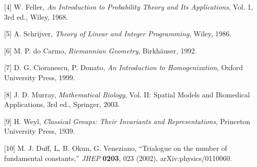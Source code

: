 \documentclass[
  11pt,
]{article}
\begin{document}
{[}4{]} W. Feller, \emph{An Introduction to Probability Theory and Its
Applications}, Vol. 1, 3rd ed., Wiley, 1968.

{[}5{]} A. Schrijver, \emph{Theory of Linear and Integer Programming},
Wiley, 1986.

{[}6{]} M. P. do Carmo, \emph{Riemannian Geometry}, Birkhäuser, 1992.

{[}7{]} D. G. Cioranescu, P. Donato, \emph{An Introduction to
Homogenization}, Oxford University Press, 1999.

{[}8{]} J. D. Murray, \emph{Mathematical Biology}, Vol. II: Spatial
Models and Biomedical Applications, 3rd ed., Springer, 2003.

{[}9{]} H. Weyl, \emph{Classical Groups: Their Invariants and
Representations}, Princeton University Press, 1939.

{[}10{]} M. J. Duff, L. B. Okun, G. Veneziano, ``Trialogue on the number
of fundamental constants,'' \emph{JHEP} \textbf{0203}, 023 (2002),
arXiv:physics/0110060.
\end{document}

